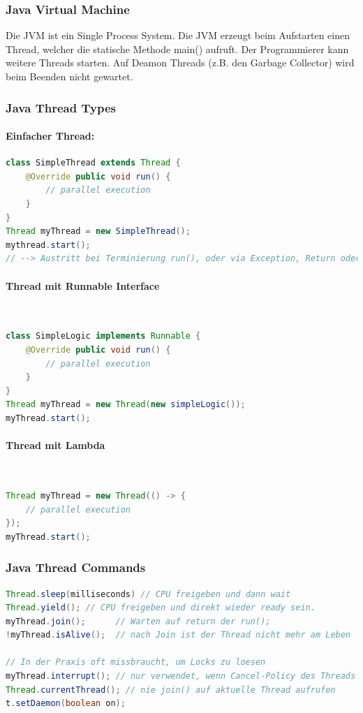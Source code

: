 \subsubsection{Java Virtual Machine}
Die JVM ist ein Single Process System. Die JVM erzeugt beim Aufstarten einen Thread, welcher die statische Methode main() aufruft. Der Programmierer kann weitere Threads starten. Auf Deamon Threads (z.B. den Garbage Collector) wird beim Beenden nicht gewartet.

\subsubsection{Java Thread Types}
\paragraph{Einfacher Thread:} \hfill

\begin{lstlisting}[language=java]
class SimpleThread extends Thread { 
	@Override public void run() {
		// parallel execution
	} 
}
Thread myThread = new SimpleThread(); 
mythread.start();
// --> Austritt bei Terminierung run(), oder via Exception, Return oder fertig.
\end{lstlisting}

\paragraph{Thread mit Runnable Interface} \hfill \\
\begin{lstlisting}[language=java]
class SimpleLogic implements Runnable { 
	@Override public void run() {
		// parallel execution
	} 
}
Thread myThread = new Thread(new simpleLogic());
myThread.start();
\end{lstlisting}

\paragraph{Thread mit Lambda} \hfill \\
\begin{lstlisting}[language=java]
Thread myThread = new Thread(() -> {
	// parallel execution
});
myThread.start();
\end{lstlisting}

\subsubsection{Java Thread Commands}
\begin{lstlisting}[language=java]
Thread.sleep(milliseconds) // CPU freigeben und dann wait
Thread.yield(); // CPU freigeben und direkt wieder ready sein.
myThread.join();      // Warten auf return der run();
!myThread.isAlive();  // nach Join ist der Thread nicht mehr am Leben

// In der Praxis oft missbraucht, um Locks zu loesen
myThread.interrupt(); // nur verwendet, wenn Cancel-Policy des Threads bekannt.
Thread.currentThread(); // nie join() auf aktuelle Thread aufrufen
t.setDaemon(boolean on);
\end{lstlisting}

